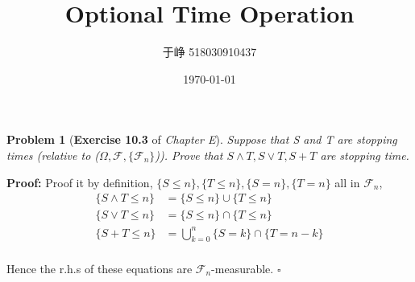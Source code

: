\documentclass[UTF8, 12pt]{article}
\title{Optional Time Operation}
\author{于峥 518030910437}
\date{\today}
\newenvironment{proof}{\noindent\ignorespaces\textbf{Proof:}}{\hfill $\square$\par\noindent}
\theoremstyle{break}
\newtheorem{problem}{Problem}
\begin{document}
    \maketitle
    
    \begin{problem}[\textbf{Exercise 10.3} of \textit{Chapter E}]
        Suppose that S and T are stopping times 
        (relative to ($\Omega, \mathcal{F}, \{ \mathcal{F}_n \}$)).         
        Prove that $S \land T , S \lor T, S + T$
        are stopping time.
    \end{problem}

    \begin{proof}
        Proof it by definition, $\{S \leq n \}, \{ T \leq n \}, \{S = n \}, \{ T = n \}$ all in $\mathcal{F}_n$, 
        \begin{align*}
            \{ S \land T \leq n \} &= \{ S \leq n \} \cup \{ T \leq n \} \\
            \{ S \lor T \leq n \} &= \{ S \leq n \} \cap \{ T \leq n \} \\
            \{ S + T \leq n \} &= \bigcup_{k=0}^n \{ S = k \} \cap \{T = n-k \} \\
        \end{align*}

        Hence the r.h.s of these equations are $\mathcal{F}_n$-measurable.
    \end{proof}
\end{document}

